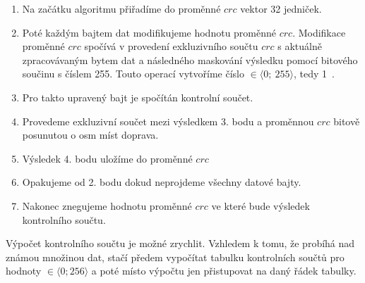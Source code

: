 

\begin{enumerate}
    \item Na začátku algoritmu přiřadíme do proměnné $crc$ vektor 32 jedniček.
    \item Poté každým bajtem dat modifikujeme hodnotu proměnné $crc$. Modifikace proměnné $crc$ spočívá v provedení exkluzivního součtu $crc$ s aktuálně zpracovávaným bytem dat a následného maskování výsledku pomocí bitového součinu s číslem 255. Touto operací vytvoříme číslo $\in \langle 0;~255 \rangle$, tedy 1~.
    \item Pro takto upravený bajt je spočítán kontrolní součet.
    \item Provedeme exkluzivní součet mezi výsledkem 3. bodu a proměnnou $crc$ bitově posunutou o osm míst doprava.
    \item Výsledek 4. bodu uložíme do proměnné $crc$
    \item Opakujeme od 2. bodu dokud neprojdeme všechny datové bajty.
    \item Nakonec znegujeme hodnotu proměnné $crc$ ve které bude výsledek kontrolního součtu.
\end{enumerate}


Výpočet kontrolního součtu je možné zrychlit. Vzhledem k tomu, že probíhá nad známou množinou dat, stačí předem vypočítat tabulku kontrolních součtů pro hodnoty $\in \langle 0; 256 \rangle$ a poté místo výpočtu jen přistupovat na daný řádek tabulky.
